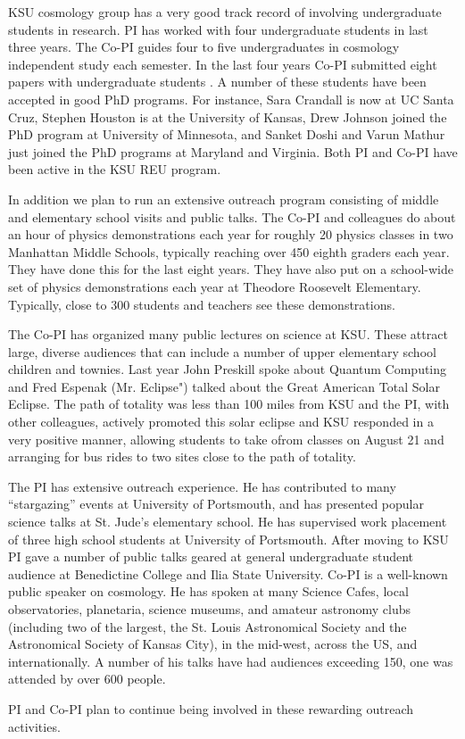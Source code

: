 KSU cosmology group has a very good track record of involving undergraduate
students in research. PI has worked with four undergraduate students in last
three years. The Co-PI guides four to five undergraduates in cosmology
independent study each semester. In the last four years Co-PI submitted eight
papers with undergraduate students \cite{2015MPLA...3050123C,2016ApJ...829...61C,2017ApJ...835...26F,2017ApJ...835...86C,2018arXiv180205571O,2018PASP..130b4101C,2018arXiv180501917C,2018MNRAS.479.4566M,2018PASP..130k4001P}. A number of these students have been
accepted in good PhD programs. For instance, Sara Crandall is now at UC Santa
Cruz, Stephen Houston is at the University of Kansas, Drew Johnson joined the
PhD program at University of Minnesota, and Sanket Doshi and Varun Mathur just
joined the PhD programs at Maryland and Virginia. Both PI and Co-PI have been
active in the KSU REU program.

In addition we plan to run an extensive outreach program consisting of middle
and elementary school visits and public talks. The Co-PI and colleagues do about
an hour of physics demonstrations each year for roughly 20 physics classes
in two Manhattan Middle Schools, typically reaching over 450 eighth
graders each year. They have done this for the last eight years. They have also
put on a school-wide set of physics demonstrations each year at Theodore
Roosevelt Elementary. Typically, close to 300 students
and teachers see these demonstrations.

The Co-PI has organized many public lectures on science at KSU. These attract
large, diverse audiences that can include a number of upper elementary school
children and townies. 
Last year John Preskill spoke about Quantum Computing and Fred Espenak (Mr.
Eclipse") talked about the Great American Total Solar Eclipse. The path of
totality was less than 100 miles from KSU and the PI, with other colleagues,
actively promoted this solar eclipse and KSU responded in a very positive
manner, allowing students to take ofrom classes on August 21 and arranging for
bus rides to two sites close to the path of totality.

The PI has extensive outreach
experience. He has contributed to many ``stargazing'' events at University of
Portsmouth, and has presented popular science talks at St. Jude's elementary
school. He has supervised work placement of three high school students at
University of Portsmouth. After moving to KSU PI gave a number of public talks
geared at general undergraduate student audience at Benedictine College and
Ilia State University. Co-PI is a well-known public speaker on cosmology. He has spoken at many
Science Cafes, local observatories, planetaria, science museums, and amateur
astronomy clubs (including two of the largest, the St. Louis Astronomical
Society and the Astronomical Society of Kansas City), in the mid-west, across
the US, and internationally. A number of his talks have had audiences exceeding
150, one was attended by over 600 people. 

PI and Co-PI plan to continue being involved in these rewarding outreach
activities.